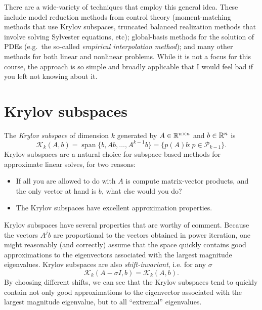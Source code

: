 \documentclass[12pt, leqno]{article} %
\begin{document}
There are a wide-variety of techniques that employ this general idea.
These include model reduction methods from control theory
(moment-matching methods that use Krylov subspaces, truncated balanced
realization methods that involve solving Sylvester equations, etc);
global-basis methods for the solution of PDEs (e.g.~the so-called {\em
empirical interpolation method}); and many other methods for both
linear and nonlinear problems.  While it is not a focus for this course,
the approach is so simple and broadly applicable that I would feel bad
if you left not knowing about it.

\section{Krylov subspaces}

The {\em Krylov subspace} of dimension $k$ generated by
$A \in \mathbb{R}^{n \times n}$ and $b \in \mathbb{R}^n$ is
\[
  \mathcal{K}_k(A,b)
    = \operatorname{span}\{ b, Ab, \ldots, A^{k-1} b \}
    = \{ p(A) b : p \in \mathcal{P}_{k-1} \}.
\]
Krylov subspaces are a natural choice for subspace-based methods for
approximate linear solves, for two reasons:
\begin{itemize}
\item If all you are allowed to do with $A$ is compute matrix-vector
  products, and the only vector at hand is $b$, what else would you do?
\item The Krylov subspaces have excellent approximation properties.
\end{itemize}

Krylov subspaces have several properties that are worthy of comment.
Because the vectors $A^{j} b$ are proportional to the vectors obtained
in power iteration, one might reasonably (and correctly)
assume that the space quickly contains good approximations to the
eigenvectors associated with the largest magnitude eigenvalues.
Krylov subspaces are also {\em shift-invariant}, i.e. for any $\sigma$
\[
  \mathcal{K}_k(A-\sigma I, b) = \mathcal{K}_k(A,b).
\]
By choosing different shifts, we can see that the Krylov subspaces
tend to quickly contain not only good approximations to the eigenvector
associated with the largest magnitude eigenvalue, but to all
``extremal'' eigenvalues.
\end{document}
